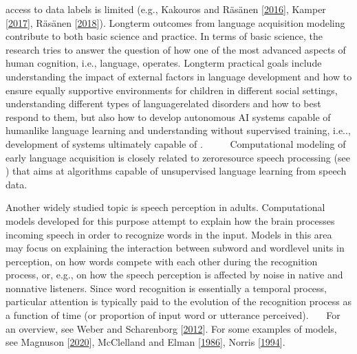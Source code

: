 \documentclass[letterpaper,10pt,english]{jupyterBook}
\begin{document}
access to data labels is limited (e.g., Kakouros and Räsänen {[}\hyperlink{cite.References:id31}{2016}{]}, Kamper  {[}\hyperlink{cite.References:id30}{2017}{]}, Räsänen  {[}\hyperlink{cite.References:id17}{2018}{]}). Long\sphinxhyphen{}term outcomes from language
acquisition modeling contribute to both basic science and practice. In
terms of basic science, the research tries to answer the question of how
one of the most advanced aspects of human cognition, i.e., language,
operates. Long\sphinxhyphen{}term practical goals include understanding the impact of
external factors in language development and how to ensure equally
supportive environments for children in different social settings,
understanding different types of language\sphinxhyphen{}related disorders and how to
best respond to them, but also how to develop autonomous AI systems
capable of human\sphinxhyphen{}like language learning and understanding without
supervised training, i.e.., development of systems ultimately capable of
.      Computational modeling of early language acquisition is closely
related to zero\sphinxhyphen{}resource speech processing (see
) that aims at algorithms capable of
unsupervised language learning from speech data.

\sphinxAtStartPar
{} Another widely studied topic is
speech perception in adults. Computational models developed for this
purpose attempt to explain how the brain processes incoming speech in
order to recognize words in the input. Models in this area may focus on
explaining the interaction between sub\sphinxhyphen{}word and word\sphinxhyphen{}level units in
perception, on how words compete with each other during the recognition
process, or, e.g., on how the speech perception is affected by noise in
native and non\sphinxhyphen{}native listeners. Since word recognition is essentially a
temporal process, particular attention is typically paid to the
evolution of the recognition process as a function of time (or
proportion of input word or utterance perceived).    For an overview, see Weber and Scharenborg {[}\hyperlink{cite.References:id12}{2012}{]}. For some examples
of models, see Magnuson  {[}\hyperlink{cite.References:id27}{2020}{]}, McClelland and Elman {[}\hyperlink{cite.References:id26}{1986}{]}, Norris {[}\hyperlink{cite.References:id22}{1994}{]}.
\end{document}
